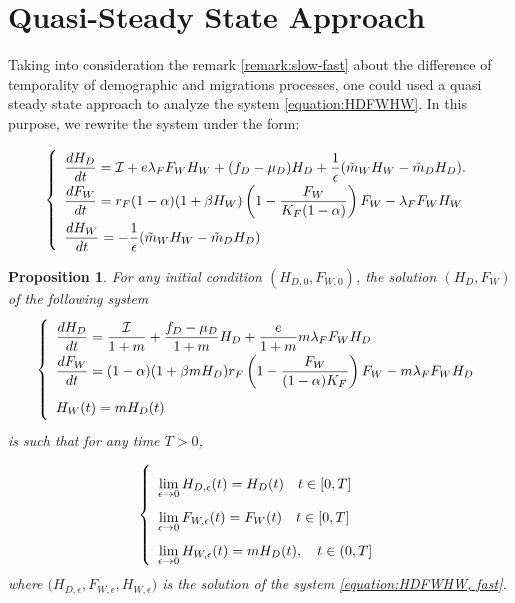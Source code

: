 \documentclass{article}
\newcommand{\lfw}{\lambda_{F}}
\newcommand{\lfw}{\lambda_{F}}
\newcommand{\cI}{\mathcal{I}}
\newcommand{\mW}{\tilde{m}_W}
\newcommand{\mD}{\tilde{m}_D}
\newtheorem{prop}{Proposition}
\begin{document}
\section{Quasi-Steady State Approach}

Taking into consideration the remark \ref{remark:slow-fast} about the difference of temporality of demographic and migrations processes, one could used a quasi steady state approach to analyze the system \eqref{equation:HDFWHW}. In this purpose, we rewrite the system under the form:

\begin{equation}
\def\arraystretch{2}
\left\{ 
\begin{array}{l}
\dfrac{dH_D}{dt}= \cI + e\lfw F_WH_W + (f_D - \mu_D) H_D + \dfrac{1}{\epsilon}(\mW H_W - \mD H_D). \\
\dfrac{dF_W}{dt} = r_F(1- \alpha) (1+ \beta H_W) \left(1 - \dfrac{F_W}{K_F(1-\alpha)} \right) F_W - \lfw F_WH_W \\
\dfrac{dH_W}{dt}= - \dfrac{1}{\epsilon}(\mW H_W - \mD H_D)
\end{array} \right.
\label{equation:HDFWHW, fast}
\end{equation}

\begin{prop}
For any initial condition $(H_{D,0}, F_{W, 0})$, the solution $(H_D, F_W)$  of the following system
\begin{equation}
\def\arraystretch{2}
\left\lbrace \begin{array}{l}
\dfrac{dH_D}{dt} = \dfrac{\cI}{1+m} + \dfrac{f_D - \mu_D}{1+m} H_D + \dfrac{e}{1+m} m \lfw F_WH_D \\
\dfrac{dF_W}{dt} = (1-\alpha) (1+\beta m H_D) r_F \left(1 - \dfrac{F_W}{(1-\alpha)K_F} \right) F_W - m \lfw F_W H_D \\
H_W(t) = m H_D(t)
\end{array} \right.
\label{equation:HDFW}
\end{equation} is such that for any time $T > 0$, 

\begin{equation*}
\def\arraystretch{2}
\left\lbrace \begin{array}{l}
\lim\limits_{ \epsilon \rightarrow 0}{H_{D, \epsilon}(t)} = H_D(t) \quad t \in [0,T] \\
\lim\limits_{ \epsilon \rightarrow 0} F_{W,  \epsilon}(t) = F_W(t)\quad t \in [0,T] \\
 \lim\limits_{ \epsilon \rightarrow 0} H_{W,  \epsilon}(t) = m H_D(t), \quad  t\in (0,T] \\
\end{array} \right.
\end{equation*}
where $\Big(H_{D, \epsilon}, F_{W,  \epsilon}, H_{W,  \epsilon} \Big)$ is the solution of the system \eqref{equation:HDFWHW, fast}.

\end{prop}
\end{document}
